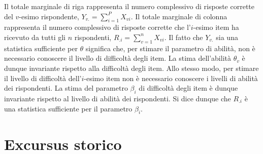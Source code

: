Il totale marginale di riga rappresenta il numero complessivo di risposte corrette del $v$-esimo rispondente, $Y_{v.}=\sum_{i=1}^P  X_{vi}$. Il totale marginale di colonna rappresenta il numero complessivo di risposte corrette che l'$i$-esimo item ha ricevuto da tutti gli $n$ rispondenti, $R_{.i}=\sum_{v=1}^n  X_{vi}$. 
Il fatto che $Y_{v.}$ sia una statistica sufficiente per $\theta$ significa che, per stimare il parametro di abilità, non è necessario conoscere il livello di difficoltà degli item. La stima dell'abilità $\theta_v$ è dunque invariante rispetto alla difficoltà degli item.  Allo stesso modo, per stimare il livello di difficoltà dell'$i$-esimo item non è necessario conoscere i livelli di abilità dei rispondenti. La stima del parametro $\beta_i$ di difficoltà degli item è dunque invariante rispetto al livello di abilità dei rispondenti. Si dice dunque che $R_{.i}$ è una statistica sufficiente per il parametro $\beta_i$.  


\section{Excursus storico}

